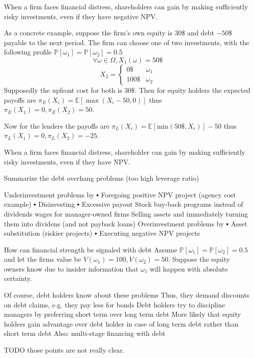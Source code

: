 When a ﬁrm faces ﬁnancial distress, shareholders can gain by
making suﬃciently risky investments, even if they have
negative NPV.



As a concrete example, suppose the firm's own equity is \( 30\$ \)
and debt \( -50\$ \) payable to the next period.
The firm can choose one of two investments, with the following profile
\( \mathbb{P}[\omega_1] = \mathbb{P}[\omega_2] = 0.5\)
\[
\forall \omega \in \Omega, X_1(\omega) = 50\$
\]
\[
X_2 = \begin{cases}
    0\$ & \omega_1 \\
    100\$ & \omega_2
\end{cases}
\]
Supposedly the upfront cost for both is \( 30\$ \).
Then for equity holders the expected payoffs are
\( \pi_E(X_i) = \mathbb{E}[\max(X_i - 50, 0)] \)
thus \( \pi_E(X_1) = 0, \pi_E(X_2) = 50\).

Now for the lenders the payoffs are
\( \pi_L(X_i) = \mathbb{E}[\text{min}(50\$, X_i)] - 50 \)
thus \( \pi_L(X_1) = 0, \pi_L(X_2) = -25\).

When a firm faces financial distress, shareholder can gain by making
sufficiently risky investments, even if they have NPV.


Summarize the debt overhang problems (too high leverage ratio)

Underinvestment problems by
▪ Foregoing positive NPV project (agency cost example)
▪ Disinvesting
▪ Excessive payout
    Stock buy-back programs instead of dividends
    wages for manager-owned firms
    Selling assets and immediately turning them into dividens (and not payback loans)
Overinvestment problems by
▪ Asset substitution (riskier projects)
▪ Executing negative NPV projects


How can financial strength be signaled with debt
Assume
\( \mathbb{P}[\omega_1] = \mathbb{P}[\omega_2] = 0.5\)
and let the firms value be \( V(\omega_1) = 100, V(\omega_2) = 50 \).
Suppose the equity owners know due to insider information that \( \omega_1 \)
will happen with absolute certainty.

Of course, debt holders know about these problems
Thus, they demand discounts on debt claims, e.g. they pay less
for bonds
Debt holders try to discipline managers by preferring short term
over long term debt
More likely that equity holders gain advantage over debt
holder in case of long term debt rather than short term debt
Also: multi-stage financing with debt

TODO those points are not really clear.


